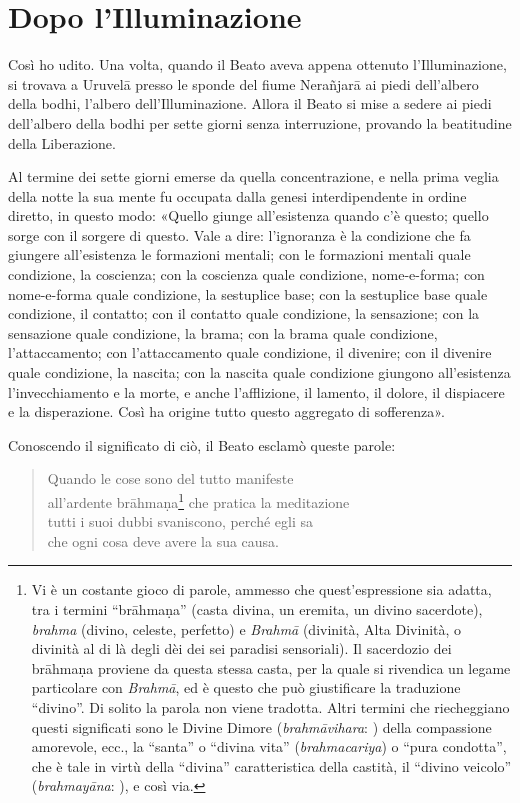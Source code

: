 \chapter{Dopo l’Illuminazione}

 Così ho udito. Una volta, quando il Beato aveva appena
ottenuto l’Illuminazione, si trovava a Uruvelā presso le sponde del
fiume Nerañjarā ai piedi dell’albero della bodhi, l’albero
dell’Illuminazione. Allora il Beato si mise a sedere ai piedi
dell’albero della bodhi per sette giorni senza interruzione, provando la
beatitudine della Liberazione.


Al termine dei sette giorni emerse da quella concentrazione, e nella
prima veglia della notte la sua mente fu occupata dalla genesi
interdipendente in ordine diretto, in questo modo: «Quello giunge
all’esistenza quando c’è questo; quello sorge con il sorgere di questo.
Vale a dire: l’ignoranza è la condizione che fa giungere all’esistenza
le formazioni mentali; con le formazioni mentali quale condizione, la
coscienza; con la coscienza quale condizione, nome-e-forma; con
nome-e-forma quale condizione, la sestuplice base; con la sestuplice
base quale condizione, il contatto; con il contatto quale condizione, la
sensazione; con la sensazione quale condizione, la brama; con la brama
quale condizione, l’attaccamento; con l’attaccamento quale condizione,
il divenire; con il divenire quale condizione, la nascita; con la
nascita quale condizione giungono all’esistenza l’invecchiamento e la
morte, e anche l’afflizione, il lamento, il dolore, il dispiacere e la
disperazione. Così ha origine tutto questo aggregato di sofferenza».


Conoscendo il significato di ciò, il Beato esclamò queste parole:


\begin{quote}
Quando le cose sono del tutto manifeste \\
all’ardente brāhmaṇa\footnote{Vi è un costante gioco di parole, ammesso che quest’espressione sia adatta, tra i termini “brāhmaṇa” (casta divina, un eremita, un divino sacerdote), \emph{brahma} (divino, celeste, perfetto) e \emph{Brahmā} (divinità, Alta Divinità, o divinità al di là degli dèi dei sei paradisi sensoriali). Il sacerdozio dei brāhmaṇa proviene da questa stessa casta, per la quale si rivendica un legame particolare con \emph{Brahmā}, ed è questo che può giustificare la traduzione “divino”. Di solito la parola non viene tradotta. Altri termini che riecheggiano questi significati sono le Divine Dimore (\emph{brahmāvihara}: \hyperlink{cap-10-Il-periodo-di-mezzo#pag200}{}) della compassione amorevole, ecc., la “santa” o “divina vita” (\emph{brahmacariya}) o “pura condotta”, che è tale in virtù della “divina” caratteristica della castità, il “divino veicolo” (\emph{brahmayāna}: \hyperlink{cap-12-La-Dottrina#pag281}{}), e così via.} che pratica la meditazione \\
tutti i suoi dubbi svaniscono, perché egli sa \\
che ogni cosa deve avere la sua causa.
\end{quote}

